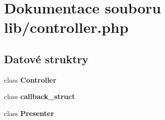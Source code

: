 \section{Dokumentace souboru lib/controller.php}
\label{d2/d87/controller_8php}
\subsection*{Datové struktry}
\begin{DoxyCompactItemize}
\item 
class {\bf Controller}
\item 
class {\bf callback\_\-struct}
\item 
class {\bf Presenter}
\end{DoxyCompactItemize}
